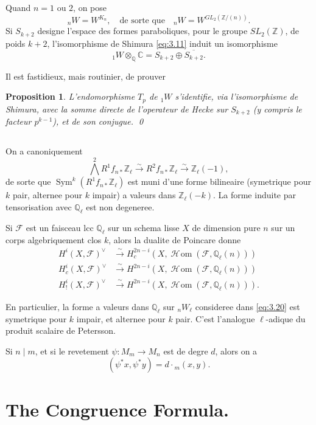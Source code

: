 \documentclass[11pt,reqno]{amsart}
\theoremstyle{plain}
\newtheorem{proposition}[theorem]{Proposition}
\theoremstyle{remark}
\DeclareMathOperator{\Sym}{Sym}
\DeclareMathOperator{\shHom}{\mathscr{H}\!om}
\newcommand{\shF}{\mathcal{F}}
\newcommand{\Z}{\mathbb{Z}}
\newcommand{\Q}{\mathbb{Q}}
\newcommand{\C}{\mathbb{C}}
\newcommand{\isom}{\xrightarrow{\sim}}
\numberwithin{equation}{section}
\begin{document}
Quand $n = 1$ ou $2$, on pose
\[
{}_nW = W^{K_n}, \quad \text{de sorte que} \quad {}_nW = W^{GL_2(\Z/(n))}.
\]
Si $S_{k+2}$ designe l'espace des formes paraboliques, pour le groupe $SL_2(\Z)$, de poids $k+2$, l'isomorphisme de Shimura \eqref{eq:3.11} induit un isomorphisme
\[
{}_1W \otimes_\Q \C = S_{k+2} \oplus \overline{S_{k+2}}.
\]

Il est fastidieux, mais routinier, de prouver

\begin{proposition}\label{prop:3.19}
L'endomorphisme $T_p$ de ${}_1W$ s'identifie, via l'isomorphisme de Shimura, avec la somme directe de l'operateur de Hecke sur $S_{k+2}$ (y compris le facteur $p^{k-1}$), et de son conjugue. \qed
\end{proposition}

\subsection{}\label{subsec:3.20}

On a canoniquement
\begin{equation}\label{eq:3.20}
\bigwedge^2 R^1f_{n*}\Z_\ell \isom R^2f_{n*}\Z_\ell \isom \Z_\ell(-1),
\end{equation}
de sorte que $\Sym^k(R^1f_{n*}\Z_\ell)$ est muni d'une forme bilineaire (symetrique pour $k$ pair, alternee pour $k$ impair) a valeurs dans $\Z_\ell(-k)$. La forme induite par tensorisation avec $\Q_\ell$ est non degeneree.

Si $\shF$ est un faisceau lcc $\Q_\ell$ sur un schema lisse $X$ de dimension pure $n$ sur un corps algebriquement clos $k$, alors la dualite de Poincare donne
\[
\begin{aligned}
H^i(X, \shF)^\vee &\isom H_c^{2n-i}(X, \shHom(\shF, \Q_\ell(n))) \\
H_c^i(X, \shF)^\vee &\isom H^{2n-i}(X, \shHom(\shF, \Q_\ell(n))) \\
H^i_!(X, \shF)^\vee &\isom H^{2n-i}(X, \shHom(\shF, \Q_\ell(n))).
\end{aligned}
\]

En particulier, la forme a valeurs dans $\Q_\ell$ sur ${}_nW_\ell$ consideree dans \eqref{eq:3.20} est symetrique pour $k$ impair, et alternee pour $k$ pair. C'est l'analogue $\ell$-adique du produit scalaire de Petersson.

Si $n \mid m$, et si le revetement $\psi: M_m \to M_n$ est de degre $d$, alors on a
\[
(\psi^*x, \psi^*y) = d \cdot {}_m(x, y).
\]


\section{The Congruence Formula.}\label{sec:4}
\end{document}

